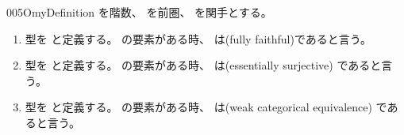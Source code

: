 \documentclass[index]{subfiles}
\begin{document}
\begin{myBlock}{005O}{myDefinition}
  を階数、
  を前圏、
  を関手とする。
  \begin{enumerate}
  \item 型を
    と定義する。
    の要素がある時、
    は(fully faithful)であると言う。
  \item 型を
    と定義する。
    の要素がある時、
    は(essentially surjective)
    であると言う。
  \item 型を
    と定義する。
    の要素がある時、
    は(weak categorical equivalence)
    であると言う。
  \end{enumerate}
\end{myBlock}
\end{document}
